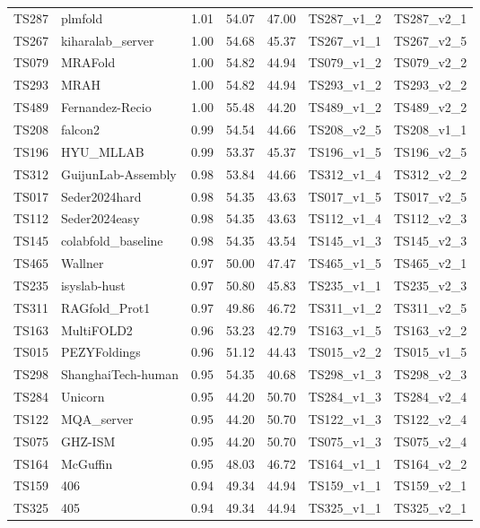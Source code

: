 \begin{longtable}{lllllll}
TS287 & plmfold & 1.01 & 54.07 & 47.00 & TS287\_v1\_2 & TS287\_v2\_1 \\ 
TS267 & kiharalab\_server & 1.00 & 54.68 & 45.37 & TS267\_v1\_1 & TS267\_v2\_5 \\ 
TS079 & MRAFold & 1.00 & 54.82 & 44.94 & TS079\_v1\_2 & TS079\_v2\_2 \\ 
TS293 & MRAH & 1.00 & 54.82 & 44.94 & TS293\_v1\_2 & TS293\_v2\_2 \\ 
TS489 & Fernandez-Recio & 1.00 & 55.48 & 44.20 & TS489\_v1\_2 & TS489\_v2\_2 \\ 
TS208 & falcon2 & 0.99 & 54.54 & 44.66 & TS208\_v2\_5 & TS208\_v1\_1 \\ 
TS196 & HYU\_MLLAB & 0.99 & 53.37 & 45.37 & TS196\_v1\_5 & TS196\_v2\_5 \\ 
TS312 & GuijunLab-Assembly & 0.98 & 53.84 & 44.66 & TS312\_v1\_4 & TS312\_v2\_2 \\ 
TS017 & Seder2024hard & 0.98 & 54.35 & 43.63 & TS017\_v1\_5 & TS017\_v2\_5 \\ 
TS112 & Seder2024easy & 0.98 & 54.35 & 43.63 & TS112\_v1\_4 & TS112\_v2\_3 \\ 
TS145 & colabfold\_baseline & 0.98 & 54.35 & 43.54 & TS145\_v1\_3 & TS145\_v2\_3 \\ 
TS465 & Wallner & 0.97 & 50.00 & 47.47 & TS465\_v1\_5 & TS465\_v2\_1 \\ 
TS235 & isyslab-hust & 0.97 & 50.80 & 45.83 & TS235\_v1\_1 & TS235\_v2\_3 \\ 
TS311 & RAGfold\_Prot1 & 0.97 & 49.86 & 46.72 & TS311\_v1\_2 & TS311\_v2\_5 \\ 
TS163 & MultiFOLD2 & 0.96 & 53.23 & 42.79 & TS163\_v1\_5 & TS163\_v2\_2 \\ 
TS015 & PEZYFoldings & 0.96 & 51.12 & 44.43 & TS015\_v2\_2 & TS015\_v1\_5 \\ 
TS298 & ShanghaiTech-human & 0.95 & 54.35 & 40.68 & TS298\_v1\_3 & TS298\_v2\_3 \\ 
TS284 & Unicorn & 0.95 & 44.20 & 50.70 & TS284\_v1\_3 & TS284\_v2\_4 \\ 
TS122 & MQA\_server & 0.95 & 44.20 & 50.70 & TS122\_v1\_3 & TS122\_v2\_4 \\ 
TS075 & GHZ-ISM & 0.95 & 44.20 & 50.70 & TS075\_v1\_3 & TS075\_v2\_4 \\ 
TS164 & McGuffin & 0.95 & 48.03 & 46.72 & TS164\_v1\_1 & TS164\_v2\_2 \\ 
TS159 & 406 & 0.94 & 49.34 & 44.94 & TS159\_v1\_1 & TS159\_v2\_1 \\ 
TS325 & 405 & 0.94 & 49.34 & 44.94 & TS325\_v1\_1 & TS325\_v2\_1 \\ 

\end{longtable}
